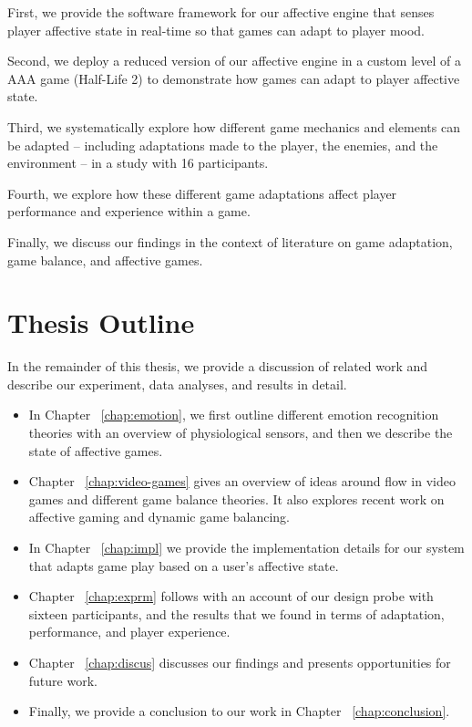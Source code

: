 First, we provide the software framework for our affective engine that senses player affective state in real-time so that games can adapt to player mood.

Second, we deploy a reduced version of our affective engine in a custom level of a AAA game (Half-Life 2) to demonstrate how games can adapt to player affective state.

Third, we systematically explore how different game mechanics and elements can be adapted – including adaptations made to the player, the enemies, and the environment – in a study with 16 participants.

Fourth, we explore how these different game adaptations affect player performance and experience within a game.

Finally, we discuss our findings in the context of literature on game adaptation, game balance, and affective games.


\section{Thesis Outline}
In the remainder of this thesis, we provide a discussion of related work and describe our experiment, data analyses, and results in detail.

\begin{itemize}
\item In Chapter ~\ref{chap:emotion}, we first outline different emotion recognition theories with an overview of physiological sensors, and then we describe the state of affective games.
\item Chapter ~\ref{chap:video-games} gives an overview of ideas around flow in video games and different game balance theories. It also explores recent work on affective gaming and dynamic game balancing.
\item In Chapter ~\ref{chap:impl} we provide the implementation details for our system that adapts game play based on a user’s affective state.
\item Chapter ~\ref{chap:exprm} follows with an account of our design probe with sixteen participants, and the results that we found in terms of adaptation, performance, and player experience.
\item Chapter ~\ref{chap:discus} discusses our findings and presents opportunities for future work.
\item Finally, we provide a conclusion to our work in Chapter ~\ref{chap:conclusion}.
\end{itemize}
